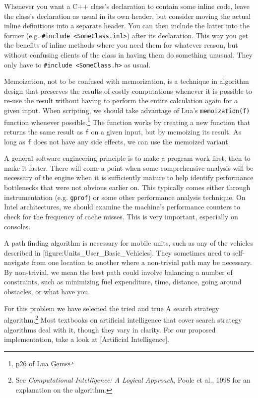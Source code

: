 Whenever you want a C++ class's declaration to contain some inline code, leave the class's declaration as usual in its own header, but consider moving the actual inline definitions into a separate header. You can then include the latter into the former (e.g. {\tt \#include <SomeClass.inl>}) after its declaration. This way you get the benefits of inline methods where you need them for whatever reason, but without confusing clients of the class in having them do something unusual. They only have to {\tt \#include <SomeClass.h>} as usual.

Memoization, not to be confused with memorization, is a technique in algorithm design that preserves the results of costly computations whenever it is possible to re-use the result without having to perform the entire calculation again for a given input. When scripting, we should take advantage of Lua's {\tt memoization(f)} function whenever possible.\footnote{p26 of Lua Gems} The function works by creating a new function that returns the same result as {\tt f} on a given input, but by memoizing its result. As long as {\tt f} does not have any side effects, we can use the memoized variant.

A general software engineering principle is to make a program work first, then to make it faster. There will come a point when some comprehensive analysis will be necessary of the engine when it is sufficiently mature to help identify performance bottlenecks that were not obvious earlier on. This typically comes either through instrumentation (e.g. {\tt gprof}) or some other performance analysis technique. On Intel architectures, we should examine the machine's performance counters to check for the frequency of cache misses. This is very important, especially on consoles.

A path finding algorithm is necessary for mobile units, such as any of the vehicles described in [figure:Units_User_Basic_Vehicles]. They sometimes need to self-navigate from one location to another where a non-trivial path may be necessary. By non-trivial, we mean the best path could involve balancing a number of constraints, such as minimizing fuel expenditure, time, distance, going around obstacles, or what have you. 

For this problem we have selected the tried and true A\top{*} search strategy algorithm.\footnote{See {\it Computational Intelligence: A Logical Approach}, Poole et al., 1998 for an explanation on the algorithm.} Most textbooks on artificial intelligence that cover search strategy algorithms deal with it, though they vary in clarity. For our proposed implementation, take a look at [Artificial Intelligence].

